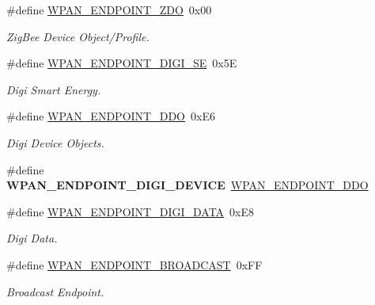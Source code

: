 \begin{DoxyCompactItemize}
\item 
\mbox{\label{group__wpan__aps_ga860a08927c4e6d7656281713186c43dd}} 
\#define \hyperlink{group__wpan__aps_ga860a08927c4e6d7656281713186c43dd}{W\+P\+A\+N\+\_\+\+E\+N\+D\+P\+O\+I\+N\+T\+\_\+\+Z\+DO}~0x00
\begin{DoxyCompactList}\small\item\em Zig\+Bee Device Object/\+Profile. \end{DoxyCompactList}\item 
\mbox{\label{group__wpan__aps_ga0c664cef1ec55fd759b5ec9d4bea2618}} 
\#define \hyperlink{group__wpan__aps_ga0c664cef1ec55fd759b5ec9d4bea2618}{W\+P\+A\+N\+\_\+\+E\+N\+D\+P\+O\+I\+N\+T\+\_\+\+D\+I\+G\+I\+\_\+\+SE}~0x5E
\begin{DoxyCompactList}\small\item\em Digi Smart Energy. \end{DoxyCompactList}\item 
\mbox{\label{group__wpan__aps_ga97ce39dc7f8bc63ac9d874b1c807158d}} 
\#define \hyperlink{group__wpan__aps_ga97ce39dc7f8bc63ac9d874b1c807158d}{W\+P\+A\+N\+\_\+\+E\+N\+D\+P\+O\+I\+N\+T\+\_\+\+D\+DO}~0x\+E6
\begin{DoxyCompactList}\small\item\em Digi Device Objects. \end{DoxyCompactList}\item 
\mbox{\label{group__wpan__aps_ga7a19c414fd3b7386a205d5150c604ef5}} 
\#define {\bfseries W\+P\+A\+N\+\_\+\+E\+N\+D\+P\+O\+I\+N\+T\+\_\+\+D\+I\+G\+I\+\_\+\+D\+E\+V\+I\+CE}~\hyperlink{group__wpan__aps_ga97ce39dc7f8bc63ac9d874b1c807158d}{W\+P\+A\+N\+\_\+\+E\+N\+D\+P\+O\+I\+N\+T\+\_\+\+D\+DO}
\item 
\mbox{\label{group__wpan__aps_ga83cb85a2a1e374554f9ad735c9c06e7b}} 
\#define \hyperlink{group__wpan__aps_ga83cb85a2a1e374554f9ad735c9c06e7b}{W\+P\+A\+N\+\_\+\+E\+N\+D\+P\+O\+I\+N\+T\+\_\+\+D\+I\+G\+I\+\_\+\+D\+A\+TA}~0x\+E8
\begin{DoxyCompactList}\small\item\em Digi Data. \end{DoxyCompactList}\item 
\mbox{\label{group__wpan__aps_ga1a2c2bd5eb7dcb276d89e7f7e9d66d32}} 
\#define \hyperlink{group__wpan__aps_ga1a2c2bd5eb7dcb276d89e7f7e9d66d32}{W\+P\+A\+N\+\_\+\+E\+N\+D\+P\+O\+I\+N\+T\+\_\+\+B\+R\+O\+A\+D\+C\+A\+ST}~0x\+FF
\begin{DoxyCompactList}\small\item\em Broadcast Endpoint. \end{DoxyCompactList}\end{DoxyCompactItemize}
